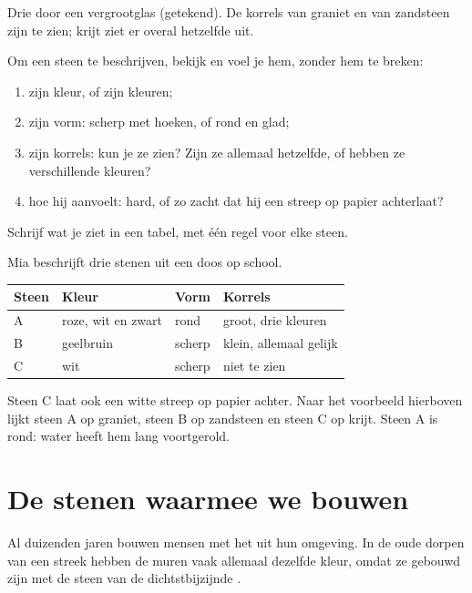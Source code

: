 \begin{omfigure}
{\small Drie  door een vergrootglas (getekend). De korrels van
graniet en van zandsteen zijn te zien; krijt ziet er overal hetzelfde uit.}
\label{fig:g3:stones-pebbles-sand:magnified}
\end{omfigure}

\begin{method}\label{met:g3:stones-pebbles-sand:look}
Om een steen te beschrijven, bekijk en voel je hem, zonder hem te breken:
\begin{enumerate}
  \item zijn kleur, of zijn kleuren;
  \item zijn vorm: scherp met hoeken, of rond en glad;
  \item zijn korrels: kun je ze zien? Zijn ze allemaal hetzelfde, of hebben
        ze verschillende kleuren?
  \item hoe hij aanvoelt: hard, of zo zacht dat hij een streep op papier
        achterlaat?
\end{enumerate}
Schrijf wat je ziet in een tabel, met één regel voor elke steen.
\end{method}

\begin{example}\label{ex:g3:stones-pebbles-sand:table}
Mia beschrijft drie stenen uit een doos op school.
\begin{center}\small
\begin{tabular}{llll}
\hline
Steen & Kleur & Vorm & Korrels \\
\hline
A & roze, wit en zwart & rond & groot, drie kleuren \\
B & geelbruin & scherp & klein, allemaal gelijk \\
C & wit & scherp & niet te zien \\
\hline
\end{tabular}
\end{center}
Steen C laat ook een witte streep op papier achter. Naar het voorbeeld
hierboven lijkt steen A op graniet, steen B op zandsteen en steen C op
krijt. Steen A is rond: water heeft hem lang voortgerold.
\end{example}

\section{De stenen waarmee we bouwen}

Al duizenden jaren bouwen mensen met het  uit hun omgeving. In de
oude dorpen van een streek hebben de muren vaak allemaal dezelfde kleur,
omdat ze gebouwd zijn met de steen van de dichtstbijzijnde .

